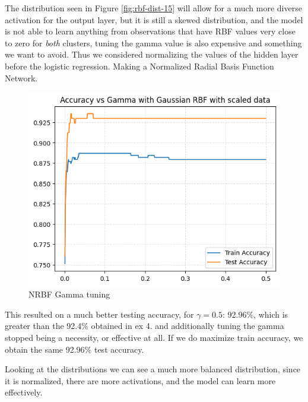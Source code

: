 \documentclass{article}
\begin{document}
\begin{enumerate}
The distribution seen in Figure \ref{fig:rbf-dist-15} will allow
for a much more diverse activation for the output layer, but it
is still a skewed distribution, and the model is not able
to learn anything from observations that have RBF values
very close to zero for \textit{both} clusters, tuning the gamma value
is also expensive and something we want to avoid. Thus we considered
normalizing the values of the hidden layer before the logistic
regression. Making a Normalized Radial Basis Function Network.

\begin{figure}[H]
  \centering
  \includegraphics[width=0.5\linewidth]{img/NormGammaHyperparameterTuning.png}
  \caption{NRBF Gamma tuning}
  \label{fig:norm-gamma-tuning}
\end{figure}

This resulted on a much better testing accuracy, for $\gamma = 0.5$:
92.96\%, which is greater than the 92.4\% obtained in ex 4. and
additionally tuning the gamma stopped being a necessity, or effective at all.
If we do maximize train accuracy, we obtain the same 92.96\% test
accuracy.

Looking at the distributions we can see a much more balanced distribution,
since it is normalized, there are more activations, and the model can learn
more effectively.


\end{enumerate}
\end{document}
